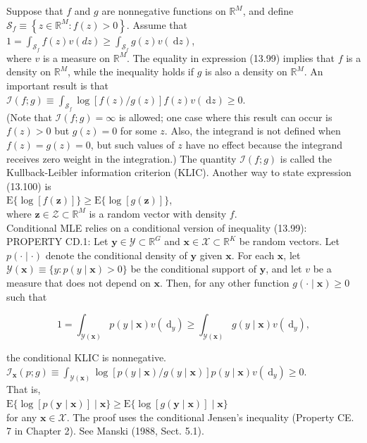 \documentclass[10pt]{article}
\begin{document}
Suppose that $f$ and $g$ are nonnegative functions on $\mathbb{R}^{M}$, and define $\mathscr{S}_{f} \equiv \left\{z \in \mathbb{R}^{M}: f(z)>0\right\}$. Assume that\\
$1=\int_{\mathscr{S}_{f}} f(z) v(d z) \geq \int_{\mathscr{S}_{f}} g(z) v(\mathrm{~d} z)$,\\
where $v$ is a measure on $\mathbb{R}^{M}$. The equality in expression (13.99) implies that $f$ is a density on $\mathbb{R}^{M}$, while the inequality holds if $g$ is also a density on $\mathbb{R}^{M}$. An important result is that\\
$\mathscr{I}(f ; g) \equiv \int_{\mathscr{S}_{f}} \log [f(z) / g(z)] f(z) v(\mathrm{~d} z) \geq 0$.\\
(Note that $\mathscr{I}(f ; g)=\infty$ is allowed; one case where this result can occur is $f(z)>0$ but $g(z)=0$ for some $z$. Also, the integrand is not defined when $f(z)=g(z)=0$, but such values of $z$ have no effect because the integrand receives zero weight in the integration.) The quantity $\mathscr{I}(f ; g)$ is called the Kullback-Leibler information criterion (KLIC). Another way to state expression (13.100) is\\
$\mathrm{E}\{\log [f(\mathbf{z})]\} \geq \mathrm{E}\{\log [g(\mathbf{z})]\}$,\\
where $\mathbf{z} \in \mathscr{Z} \subset \mathbb{R}^{M}$ is a random vector with density $f$.\\
Conditional MLE relies on a conditional version of inequality (13.99):\\
PROPERTY CD.1: Let $\mathbf{y} \in \mathscr{Y} \subset \mathbb{R}^{G}$ and $\mathbf{x} \in \mathscr{X} \subset \mathbb{R}^{K}$ be random vectors. Let $p(\cdot \mid \cdot)$ denote the conditional density of $\mathbf{y}$ given $\mathbf{x}$. For each $\mathbf{x}$, let $\mathscr{Y}(\mathbf{x}) \equiv\{y: p(y \mid \mathbf{x})>0\}$ be the conditional support of $\mathbf{y}$, and let $v$ be a measure that does not depend on $\mathbf{x}$. Then, for any other function $g(\cdot \mid \mathbf{x}) \geq 0$ such that

$$
1=\int_{\mathscr{Y}(\mathbf{x})} p(y \mid \mathbf{x}) v\left(\mathrm{~d}_{y}\right) \geq \int_{\mathscr{Y}(\mathbf{x})} g(y \mid \mathbf{x}) v\left(\mathrm{~d}_{y}\right),
$$

the conditional KLIC is nonnegative.\\
$\mathscr{I}_{\mathbf{x}}(p ; g) \equiv \int_{\mathscr{Y}(\mathbf{x})} \log [p(y \mid \mathbf{x}) / g(y \mid \mathbf{x})] p(y \mid \mathbf{x}) v\left(\mathrm{~d}_{y}\right) \geq 0$.\\
That is,\\
$\mathrm{E}\{\log [p(\mathbf{y} \mid \mathbf{x})] \mid \mathbf{x}\} \geq \mathrm{E}\{\log [g(\mathbf{y} \mid \mathbf{x})] \mid \mathbf{x}\}$\\
for any $\mathbf{x} \in \mathscr{X}$. The proof uses the conditional Jensen's inequality (Property CE. 7 in Chapter 2). See Manski (1988, Sect. 5.1).
\end{document}
